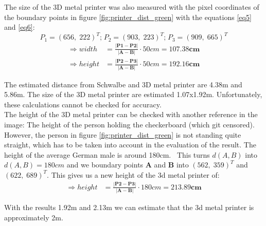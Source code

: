 The size of the 3D metal printer was also measured with the pixel coordinates of the boundary points in figure \ref{fig:printer_dist_green} with the equations \ref{eq5}  and \ref{eq6}: 
\vspace{1mm}
\begin{equation*}
    P_1 = (656,\;222)^{T}\text{;}\; P_2 = (903,\;223)^{T}\text{;}\; P_3 = (909,\;665)^{T}
\end{equation*}
\vspace{-10mm}
\begin{align*}
    \Rightarrow width &= \frac{|\bm{P1}-\bm{P2}|}{|\bm{A}-\bm{B}|}\cdot 50cm = \bm{107.38cm}\\
    \Rightarrow  height &= \frac{|\bm{P2}-\bm{P3}|}{|\bm{A}-\bm{B}|}\cdot 50cm = \bm{192.16cm}
\end{align*}

The estimated distance from Schwalbe and 3D metal printer are 4.38m and 5.86m. The size of the 3D metal printer are estimated 1.07x1.92m. Unfortunately, these calculations cannot be checked for accuracy.\\

The height of the 3D metal printer can be checked with another reference in the image: The height of the person holding the checkerboard (which git censored). However, the person in figure \ref{fig:printer_dist_green} is not standing quite straight, which has to be taken into account in the evaluation of the result. The height of the average German male is around 180cm.~\cite{height_person} This turns $d(A, B)$ into $d(A, B) = 180cm$ and we boundary points \textbf{A} and \textbf{B} into $(562,\;359)^{T}$ and $(622,\;689)^{T}$. This gives us a new height of the 3d metal printer of:
\vspace{1mm}
\begin{align*}
    \Rightarrow  height &= \frac{|\bm{P2}-\bm{P3}|}{|\bm{A}-\bm{B}|}\cdot 180cm = \bm{213.89cm}
\end{align*}

With the results 1.92m and 2.13m we can estimate that the 3d metal printer is approximately 2m.
